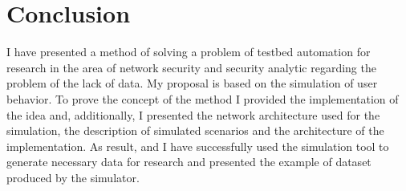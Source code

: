 
\section{Conclusion}

I have presented a method of solving a problem of testbed automation for research in the area of network security and security analytic regarding the problem of the lack of data. My proposal is based on the simulation of user behavior. To prove the concept of the method I provided the implementation of the idea and, additionally, I presented the network  architecture used for the simulation, the description of simulated scenarios and the architecture of the implementation. As result, and I have successfully used the simulation tool to generate necessary data for research and presented the example of dataset produced by the simulator.